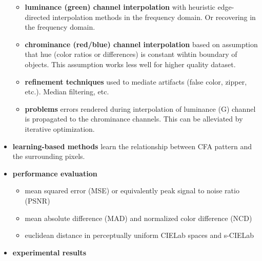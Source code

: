 \documentclass[11pt]{article}
\newcommand{\linkpaper}[3][.]{
    \noindent\href[page=#2]{#1}{\uscore{#3}}
}
\begin{document}
\begin{itemize}
\begin{itemize}
        \item \textbf{luminance (green) channel interpolation} with heuristic edge-directed interpolation methods in the frequency domain. Or recovering in the frequency domain.
        \item \textbf{chrominance (red/blue) channel interpolation} based on assumption that hue (color ratios or differences) is constant wihtin boundary of objects. This assumption works less well for higher quality dataset. 
        \item \textbf{refinement techniques} used to mediate artifacts (false color, zipper, etc.). Median filtering, etc.
        \item \textbf{problems} errors rendered during interpolation of luminance (G) channel is propagated to the chrominance channels. This can be alleviated by iterative optimization.
    \end{itemize}
    \item \textbf{learning-based methods} learn the relationship between CFA pattern and the surrounding pixels.
    \item \textbf{performance evaluation}
    \begin{itemize}
        \item mean squared error (MSE) or equivalently peak signal to noise ratio (PSNR) 
        \item mean absolute difference (MAD) and normalized color difference (NCD)
        \item euclidean distance in perceptually uniform CIELab spaces and s-CIELab
    \end{itemize}
    \item \textbf{experimental results}
\end{itemize}
\end{document}
